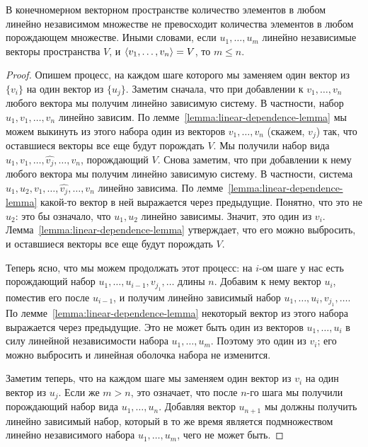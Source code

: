 \begin{theorem}\label{thm:independent-set-smaller-than-generating}
В конечномерном векторном пространстве количество элементов в любом линейно независимом
множестве не превосходит количества элементов в любом порождающем множестве.
Иными словами, если $u_1,\dots,u_m$ линейно независимые векторы пространства $V$,
и $\langle v_1,\dots,v_n\rangle = V$, то $m\leq n$.
\end{theorem}
\begin{proof}
Опишем процесс, на каждом шаге которого мы заменяем один
вектор из $\{v_i\}$ на один вектор из $\{u_j\}$.
Заметим сначала, что при добавлении к $v_1,\dots,v_n$ любого вектора
мы получим линейно зависимую систему. В частности, набор
$u_1,v_1,\dots,v_n$ линейно зависим. По лемме~\ref{lemma:linear-dependence-lemma}
мы можем выкинуть из этого набора один из векторов $v_1,\dots,v_n$
(скажем, $v_j$) так,
что оставшиеся векторы все еще будут порождать $V$.
Мы получили набор вида $u_1,v_1,\dots,\widehat{v_j},\dots,v_n$, порождающий $V$.
Снова заметим, что при добавлении к нему любого вектора мы получим линейно зависимую
систему. В частности, система $u_1,u_2,v_1,\dots,\widehat{v_j},\dots,v_n$ линейно зависима.
По лемме~\ref{lemma:linear-dependence-lemma} какой-то вектор в ней выражается через предыдущие.
Понятно, что это не $u_2$: это бы означало, что $u_1,u_2$ линейно зависимы.
Значит, это один из $v_i$. Лемма~\ref{lemma:linear-dependence-lemma} утверждает, что его
можно выбросить, и оставшиеся векторы все еще будут порождать $V$.

Теперь ясно, что мы можем продолжать этот процесс: на $i$-ом шаге у нас есть
порождающий набор $u_1,\dots,u_{i-1},v_{j_1},\dots$ длины $n$. Добавим к нему вектор $u_i$,
поместив его после $u_{i-1}$, и получим линейно зависимый набор
$u_1,\dots,u_i,v_{j_1},\dots$. По лемме~\ref{lemma:linear-dependence-lemma} некоторый
вектор из этого набора выражается через предыдущие. Это не может быть один из векторов
$u_1,\dots,u_i$ в силу линейной независимости набора $u_1,\dots,u_m$.
Поэтому это один из $v_i$; его можно выбросить и линейная оболочка набора не изменится.

Заметим теперь, что на каждом шаге мы заменяем один вектор из $v_i$ на один вектор
из $u_j$.
Если же $m>n$, это означает, что после $n$-го шага мы получили порождающий набор
вида $u_1,\dots,u_n$. Добавляя вектор $u_{n+1}$ мы должны получить линейно зависимый
набор, который в то же время является подмножеством линейно независимого набора
$u_1,\dots,u_m$, чего не может быть.
\end{proof}

